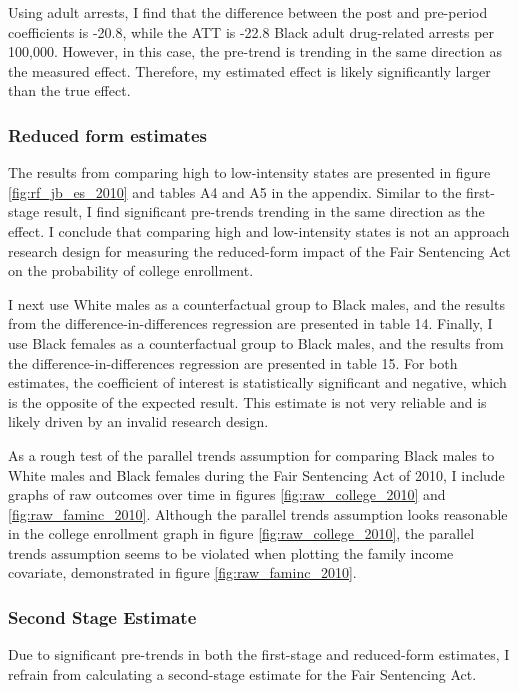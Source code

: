 \documentclass{article}
\begin{document}
Using adult arrests, I find that the difference between the post and pre-period coefficients is -20.8, while the ATT is -22.8 Black adult drug-related arrests per 100,000. However, in this case, the pre-trend is trending in the same direction as the measured effect. Therefore, my estimated effect is likely significantly larger than the true effect. 

\subsubsection{Reduced form estimates}

The results from comparing high to low-intensity states are presented in figure \ref{fig:rf_jb_es_2010} and tables A4 and A5 in the appendix. Similar to the first-stage result, I find significant pre-trends trending in the same direction as the effect. I conclude that comparing high and low-intensity states is not an approach research design for measuring the reduced-form impact of the Fair Sentencing Act on the probability of college enrollment. 

I next use White males as a counterfactual group to Black males, and the results from the difference-in-differences regression are presented in table 14. Finally, I use Black females as a counterfactual group to Black males, and the results from the difference-in-differences regression are presented in table 15. For both estimates, the coefficient of interest is statistically significant and negative, which is the opposite of the expected result. This estimate is not very reliable and is likely driven by an invalid research design.

As a rough test of the parallel trends assumption for comparing Black males to White males and Black females during the Fair Sentencing Act of 2010, I include graphs of raw outcomes over time in figures \ref{fig:raw_college_2010} and \ref{fig:raw_faminc_2010}. Although the parallel trends assumption looks reasonable in the college enrollment graph in figure \ref{fig:raw_college_2010}, the parallel trends assumption seems to be violated when plotting the family income covariate, demonstrated in figure \ref{fig:raw_faminc_2010}.

\subsubsection{Second Stage Estimate}

Due to significant pre-trends in both the first-stage and reduced-form estimates, I refrain from calculating a second-stage estimate for the Fair Sentencing Act.
\end{document}
